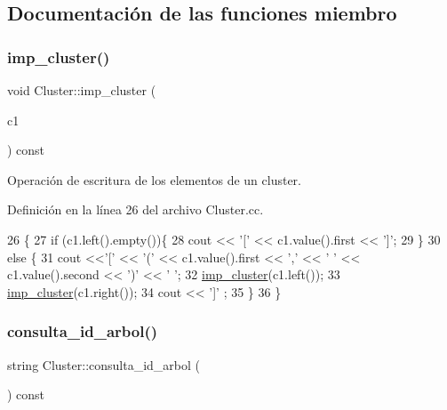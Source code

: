 \subsection{Documentación de las funciones miembro}
\mbox{\label{class_cluster_a25c0220fbad15328b30df8f9cf0c845a}} 
\subsubsection{\texorpdfstring{imp\+\_\+cluster()}{imp\_cluster()}}
{\footnotesize\ttfamily void Cluster\+::imp\+\_\+cluster (\begin{DoxyParamCaption}\item[{const Bin\+Tree$<$ pair$<$ string, double $>$ $>$ \&}]{c1 }\end{DoxyParamCaption}) const\hspace{0.3cm}{\ttfamily [private]}}



Operación de escritura de los elementos de un cluster. 



Definición en la línea 26 del archivo Cluster.\+cc.


\begin{DoxyCode}
26                                                                         \{
27     \textcolor{keywordflow}{if} (c1.left().empty())\{
28         cout << \textcolor{charliteral}{'['} << c1.value().first << \textcolor{charliteral}{']'};
29     \}
30     \textcolor{keywordflow}{else} \{
31         cout <<\textcolor{charliteral}{'['} << \textcolor{charliteral}{'('} << c1.value().first << \textcolor{charliteral}{','} << \textcolor{charliteral}{' '} << c1.value().second << \textcolor{charliteral}{')'} << \textcolor{charliteral}{' '};
32         \hyperlink{class_cluster_a25c0220fbad15328b30df8f9cf0c845a}{imp\_cluster}(c1.left());
33         \hyperlink{class_cluster_a25c0220fbad15328b30df8f9cf0c845a}{imp\_cluster}(c1.right());
34         cout << \textcolor{charliteral}{']'} ;
35     \}
36 \}
\end{DoxyCode}
\mbox{\label{class_cluster_a2e994baf889c15dbb0e6111070c08d5d}} 
\subsubsection{\texorpdfstring{consulta\+\_\+id\+\_\+arbol()}{consulta\_id\_arbol()}}
{\footnotesize\ttfamily string Cluster\+::consulta\+\_\+id\+\_\+arbol (\begin{DoxyParamCaption}{ }\end{DoxyParamCaption}) const}



